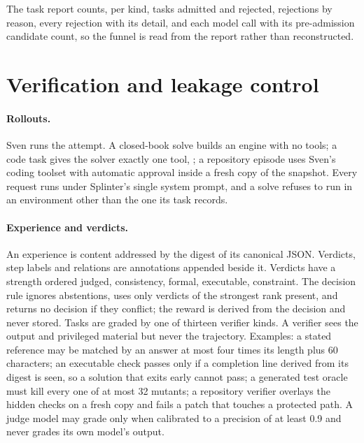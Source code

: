 The task report counts, per kind, tasks admitted and rejected, rejections by reason,
every rejection with its detail, and each model call with its pre-admission candidate
count, so the funnel is read from the report rather than reconstructed.

\section{Verification and leakage control}\label{sec:verify}

\paragraph{Rollouts.} Sven runs the attempt. A closed-book solve builds an engine with
no tools; a code task gives the solver exactly one tool, ;
a repository episode uses Sven's coding toolset with automatic approval inside a fresh
copy of the snapshot. Every request runs under Splinter's single system
prompt, and a solve refuses to run in an environment other than the one its task
records.

\paragraph{Experience and verdicts.} An experience is content addressed by the digest of
its canonical JSON. Verdicts, step labels and relations are annotations
appended beside it. Verdicts have a strength ordered judged, consistency,
formal, executable, constraint. The decision rule ignores abstentions, uses only
verdicts of the strongest rank present, and returns no decision if they conflict;
the reward is derived from the decision and never stored. Tasks are graded by one
of thirteen verifier kinds. A verifier sees the output and privileged material but
never the trajectory. Examples: a stated reference may be matched by an answer at
most four times its length plus 60 characters; an executable check passes only if
a completion line derived from its digest is seen, so a solution that exits early cannot
pass; a generated test oracle must kill every one of at most 32 mutants;
a repository verifier overlays the hidden checks on a fresh copy and fails a patch that
touches a protected path. A judge model may grade only when calibrated to a
precision of at least 0.9 and never grades its own model's output.

